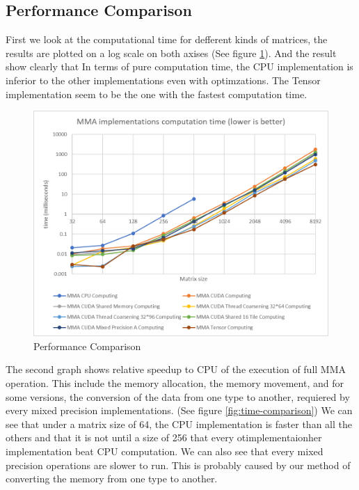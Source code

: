 \documentclass[conference]{IEEEtran}
\begin{document}
  \subsection{Performance Comparison}\label{sec:performance-comparison}

  First we look at the computational time for defferent kinds of matrices,
  the results are plotted on a log scale on both axises (See figure \ref{fig:performance-comparison}). And the result show clearly that
  In terms of pure computation time, the CPU implementation is inferior to the other implementations even with optimzations.
  The Tensor implementation seem to be the one with the fastest computation time.

  \begin{figure}[h]
    \centering
    \includegraphics[scale=0.5]{figures/Comp_time_2.png}
    \caption{Performance Comparison}
    \label{fig:performance-comparison}
  \end{figure}

  The second graph shows relative speedup to CPU of the execution of full MMA operation. 
  This include the memory allocation, the memory movement, and for some versions,
  the conversion of the data from one type to another, requiered by every mixed precision
  implementations. (See figure \ref{fig:time-comparison})
  We can see that under a matrix size of 64, the CPU implementation is faster than all the others
  and that it is not until a size of 256 that every otimplementaionher implementation beat CPU computation.
  We can also see that every mixed precision operations are slower to run. This is probably caused by
  our method of converting the memory from one type to another.
\end{document}

